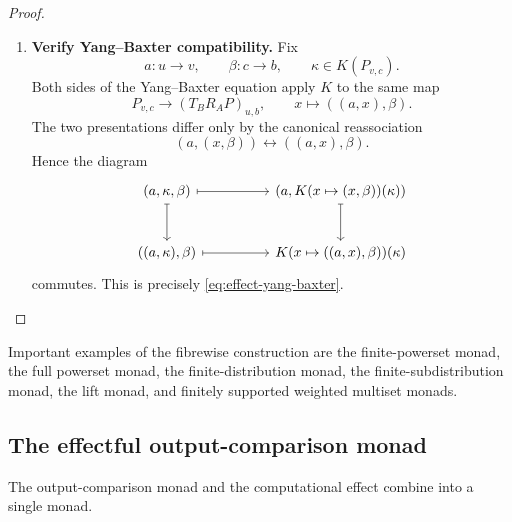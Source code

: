 \begin{proof}
\begin{enumerate}
        \item \textbf{Verify Yang--Baxter compatibility.}
        Fix
        \[
            a:u\to v,
            \qquad
            \beta:c\to b,
            \qquad
            \kappa\in K(P_{v,c}).
        \]
        Both sides of the Yang--Baxter equation apply \(K\) to the same map
        \[
            P_{v,c}
            \longrightarrow
            (T_BR_AP)_{u,b},
            \qquad
            x\longmapsto((a,x),\beta).
        \]
        The two presentations differ only by the canonical reassociation
        \[
            (a,(x,\beta))
            \longleftrightarrow
            ((a,x),\beta).
        \]
        Hence the diagram
        \[
            \begin{tikzcd}[column sep=huge, row sep=large]
                    (a,\kappa,\beta)
                        \arrow[r, maps to]
                        \arrow[d, maps to]
                &
                    (a,K(x\mapsto(x,\beta))(\kappa))
                        \arrow[d, maps to]
                \\
                    ((a,\kappa),\beta)
                        \arrow[r, maps to]
                &
                    K(x\mapsto((a,x),\beta))(\kappa)
            \end{tikzcd}
        \]
        commutes. This is precisely
        \eqref{eq:effect-yang-baxter}.
    \end{enumerate}
\end{proof}

Important examples of the fibrewise construction are the finite-powerset
monad, the full powerset monad, the finite-distribution monad, the
finite-subdistribution monad, the lift monad, and finitely supported weighted
multiset monads.

\subsection{The effectful output-comparison monad}
\label{subsec:effectful-output-comparison-monad}

The output-comparison monad and the computational effect combine into a single
monad.

